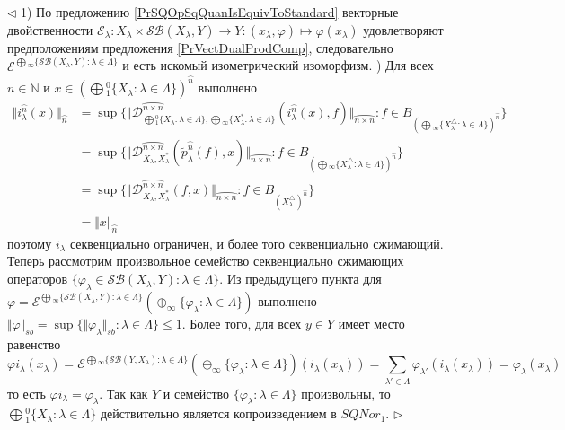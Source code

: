 \documentclass[12pt]{article}
\newenvironment{proof}{\par $\triangleleft$}{$\triangleright$}
\begin{document}
\begin{proof} 1) По предложению \ref{PrSQOpSqQuanIsEquivToStandard} векторные двойственности $\mathcal{E}_\lambda:X_\lambda\times\mathcal{SB}(X_\lambda,Y)\to Y:(x_\lambda,\varphi)\mapsto \varphi(x_\lambda)$ удовлетворяют предположениям предложения \ref{PrVectDualProdComp}, следовательно $\mathcal{E}^{\bigoplus{}_\infty\{\mathcal{SB}(X_\lambda,Y):\lambda\in\Lambda\}}$ и есть искомый изометрический изоморфизм.
) Для всех $n\in\mathbb{N}$ и $x\in \left(\bigoplus{}_1^0\{X_\lambda:\lambda\in\Lambda\}\right)^{\wideparen{n}}$ выполнено
$$
\begin{aligned}
\Vert i_\lambda^{\wideparen{n}}(x)\Vert_{\wideparen{n}}
&=\sup\{\Vert\mathcal{D}_{\bigoplus{}_1^0\{X_\lambda:\lambda\in \Lambda\},\bigoplus{}_\infty\{X_\lambda^*:\lambda\in \Lambda\}}^{\wideparen{n\times n}}(i_\lambda^{\wideparen{n}}(x),f)\Vert_{\wideparen{n\times n}}: f\in B_{(\bigoplus{}_\infty\{X_\lambda^\triangle:\lambda\in \Lambda\})^{\wideparen{n}}}\}\\
&=\sup\{\Vert\mathcal{D}_{X_\lambda,X_\lambda^*}^{\wideparen{n\times n}}(\tilde{p}_\lambda^{\wideparen{n}}(f),x)\Vert_{\wideparen{n\times n}}: f\in B_{(\bigoplus{}_\infty\{X_\lambda^\triangle:\lambda\in \Lambda\})^{\wideparen{n}}}\}\\
&=\sup\{\Vert\mathcal{D}_{X_\lambda,X_\lambda^*}^{\wideparen{n\times n}}(f,x)\Vert_{\wideparen{n\times n}}: f\in B_{(X_\lambda^\triangle)^{\wideparen{n}}}\}\\
&=\Vert x\Vert_{\wideparen{n}}
\end{aligned}
$$ 
поэтому $i_\lambda$ секвенциально ограничен, и более того секвенциально сжимающий. Теперь рассмотрим произвольное семейство секвенциально сжимающих операторов $\{\varphi_\lambda\in\mathcal{SB}(X_\lambda,Y):\lambda\in\Lambda\}$. Из предыдущего пункта для  $\varphi=\mathcal{E}^{\bigoplus{}_\infty\{\mathcal{SB}(X_\lambda,Y):\lambda\in\Lambda\}}(\oplus_\infty\{\varphi_\lambda:\lambda\in\Lambda\})$ выполнено $\Vert\varphi\Vert_{sb}=\sup\{\Vert\varphi_\lambda\Vert_{sb}:\lambda\in\Lambda\}\leq 1$. Более того, для всех $y\in Y$ имеет место равенство
$$
\varphi i_\lambda(x_\lambda)
=\mathcal{E}^{\bigoplus{}_\infty\{\mathcal{SB}(Y,X_\lambda):\lambda\in\Lambda\}}(\oplus_\infty\{\varphi_\lambda:\lambda\in\Lambda\})(i_\lambda(x_\lambda))
=\sum\limits_{\lambda'\in\Lambda}\varphi_{\lambda'}(i_\lambda(x_\lambda))
=\varphi_\lambda(x_\lambda)
$$
то есть $\varphi i_\lambda=\varphi_\lambda$. Так как $Y$ и семейство $\{\varphi_\lambda:\lambda\in\Lambda\}$ произвольны, то $\bigoplus{}_1^0\{X_\lambda:\lambda\in\Lambda\}$ действительно является копроизведением в $SQNor_1$.
\end{proof}
\end{document}
